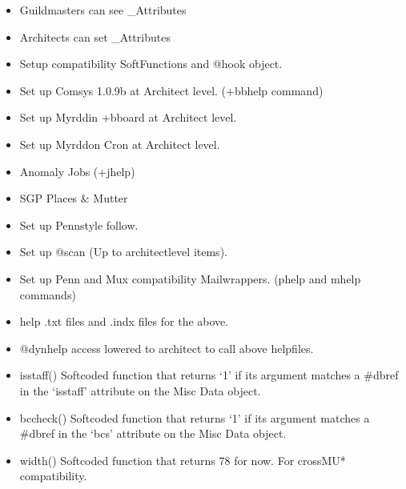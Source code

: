 \documentclass[letterpaper,10pt,english]{sphinxmanual}
\begin{document}
\begin{itemize}
\item {} 
\sphinxAtStartPar
Guildmasters can see \_Attributes

\item {} 
\sphinxAtStartPar
Architects can set \_Attributes

\item {} 
\sphinxAtStartPar
Set\sphinxhyphen{}up compatibility SoftFunctions and @hook object.

\item {} 
\sphinxAtStartPar
Set up Comsys 1.0.9b at Architect level. (+bbhelp command)

\item {} 
\sphinxAtStartPar
Set up Myrddin +bboard at Architect level.

\item {} 
\sphinxAtStartPar
Set up Myrddon Cron at Architect level.

\item {} 
\sphinxAtStartPar
Anomaly Jobs (+jhelp)

\item {} 
\sphinxAtStartPar
SGP Places \& Mutter

\item {} 
\sphinxAtStartPar
Set up Penn\sphinxhyphen{}style follow.

\item {} 
\sphinxAtStartPar
Set up @scan (Up to architect\sphinxhyphen{}level items).

\item {} 
\sphinxAtStartPar
Set up Penn\sphinxhyphen{} and Mux compatibility Mailwrappers. (phelp and mhelp commands)

\item {} 
\sphinxAtStartPar
help .txt files and .indx files for the above.

\item {} 
\sphinxAtStartPar
@dynhelp access lowered to architect to call above helpfiles.

\item {} 
\sphinxAtStartPar
isstaff() \sphinxhyphen{} Softcoded function that returns ‘1’ if its argument matches
a \#dbref in the ‘isstaff’ attribute on the Misc Data object.

\item {} 
\sphinxAtStartPar
bccheck() \sphinxhyphen{} Softcoded function that returns ‘1’ if its argument matches
a \#dbref in the ‘bcs’ attribute on the Misc Data object.

\item {} 
\sphinxAtStartPar
width() \sphinxhyphen{} Softcoded function that returns 78 for now. For cross\sphinxhyphen{}MU*
compatibility.


\end{itemize}
\end{document}
